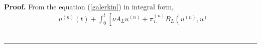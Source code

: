 \documentclass[11pt]{preprint}
\newenvironment{proof}[1][Proof]{\textbf{#1.} }{\ \rule{0.5em}{0.5em}}
\begin{document}
\begin{proof}
%
From the equation (\ref{galerkin}) in integral form,
\begin{align*}
& u^{\left(  n\right)  }(t)+\int_{0}^{t}\left[  \nu A_{L}u^{\left(  n\right)
}+\pi_{L}^{\left(  n\right)  }B_{L}\left(  u^{\left(  n\right)  },u^{\left(
}
\end{align*}
\end{proof}
\end{document}
